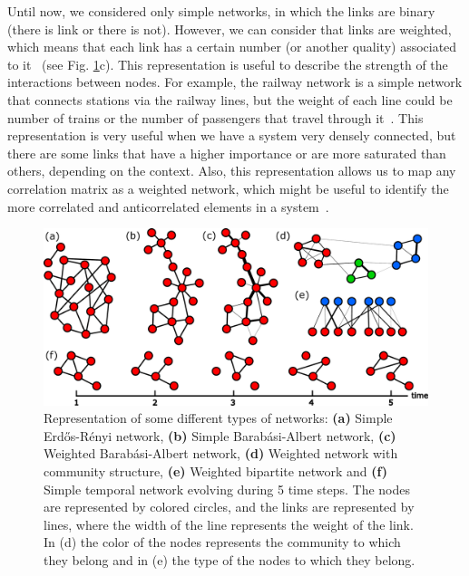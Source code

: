 Until now, we considered only simple networks, in which the links are binary (there is link or there is not). However, we can consider that links are weighted, which means that each link has a certain number (or another quality) associated to it~\cite{barrat2004architecture} (see Fig. \ref{fig:netwotk_types}c). This representation is useful to describe the strength of the interactions between nodes. For example, the railway network is a simple network that connects stations via the railway lines, but the weight of each line could be number of trains or the number of passengers that travel through it~\cite{latora-2002}. This representation is very useful when we have a system very densely connected, but there are some links that have a higher importance or are more saturated than others, depending on the context. Also, this representation allows us to map any correlation matrix as a weighted network, which might be useful to identify the more correlated and anticorrelated elements in a system~\cite{onnela-2003,tumminello-2005}.

\begin{figure}
    \centering
    \includegraphics[width=\textwidth]{Figs/Introduction/network_plot.pdf}
    \caption[Different network types]{Representation of some different types of networks: \textbf{(a)} Simple Erd\H{o}s-R\'enyi network, \textbf{(b)} Simple Barab\'asi-Albert network, \textbf{(c)} Weighted Barab\'asi-Albert network, \textbf{(d)} Weighted network with community structure, \textbf{(e)} Weighted bipartite network and \textbf{(f)} Simple temporal network evolving during 5 time steps. The nodes are represented by colored circles, and the links are represented by lines, where the width of the line represents the weight of the link. In (d) the color of the nodes represents the community to which they belong and in (e) the type of the nodes to which they belong.}
    \label{fig:netwotk_types}
\end{figure}


